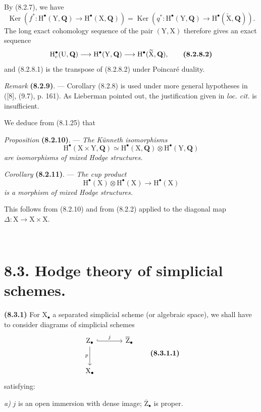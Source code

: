 \documentclass[11pt,leqno]{article}
\newcommand{\Page}[1]{\ifvmode\noindent\else\unskip\ \fi{\footnotesize\textcolor{gray}{[p.\,#1]}}\ \ignorespaces}
\begin{document}
By (8.2.7), we have
\[
\operatorname{Ker}(f^*:\mathrm{H}^\bullet(\mathrm{Y},\mathbf{Q})
 \to\mathrm{H}^\bullet(\mathrm{X},\mathbf{Q}))
=
\operatorname{Ker}(q^*:\mathrm{H}^\bullet(\mathrm{Y},\mathbf{Q})
 \to\mathrm{H}^\bullet(\widetilde{\mathrm{X}},\mathbf{Q})).
\]
The long exact cohomology sequence of the pair \((\mathrm{Y},\mathrm{X})\) therefore gives an exact sequence
\[
\mathrm{H}_c^\bullet(\mathrm{U},\mathbf{Q})
\longrightarrow\mathrm{H}^\bullet(\mathrm{Y},\mathbf{Q})
\longrightarrow\mathrm{H}^\bullet(\widetilde{\mathrm{X}},\mathbf{Q}),
\tag*{\textbf{(8.2.8.2)}}
\]
and (8.2.8.1) is the transpose of (8.2.8.2) under Poincaré duality.

\textit{Remark} \textbf{(8.2.9)}. — Corollary (8.2.8) is used under more general hypotheses in ([8], (9.7), p. 161). As Lieberman pointed out, the justification given in \textit{loc. cit.} is insufficient.

We deduce from (8.1.25) that

\textit{Proposition} \textbf{(8.2.10)}. — \textit{The Künneth isomorphisms}
\[
\mathrm{H}^\bullet(\mathrm{X}\times\mathrm{Y},\mathbf{Q})
\simeq
\mathrm{H}^\bullet(\mathrm{X},\mathbf{Q})
\otimes\mathrm{H}^\bullet(\mathrm{Y},\mathbf{Q})
\]
\textit{are isomorphisms of mixed Hodge structures.}

\textit{Corollary} \textbf{(8.2.11)}. — \textit{The cup product}
\[
\mathrm{H}^\bullet(\mathrm{X})\otimes\mathrm{H}^\bullet(\mathrm{X})
\longrightarrow\mathrm{H}^\bullet(\mathrm{X})
\]
\textit{is a morphism of mixed Hodge structures.}

This follows from (8.2.10) and from (8.2.2) applied to the diagonal map \(\Delta:\mathrm{X}\to\mathrm{X}\times\mathrm{X}\).

\Page{41}
\section*{8.3. Hodge theory of simplicial schemes.}

\textbf{(8.3.1)} For  \(\mathrm{X}_\bullet\) a separated simplicial scheme (or algebraic space), we shall have to consider diagrams of simplicial schemes
\[
\begin{tikzcd}[column sep=large,row sep=large]
\mathrm{Z}_\bullet \arrow[r,hook,"j"] \arrow[d,"p"']
 & \overline{\mathrm{Z}}_\bullet\\
\mathrm{X}_\bullet &
\end{tikzcd}
\tag*{\textbf{(8.3.1.1)}}
\]
satisfying:

\textit{a)} \(j\) is an open immersion with dense image; \(\overline{\mathrm{Z}}_\bullet\) is proper.
\end{document}
